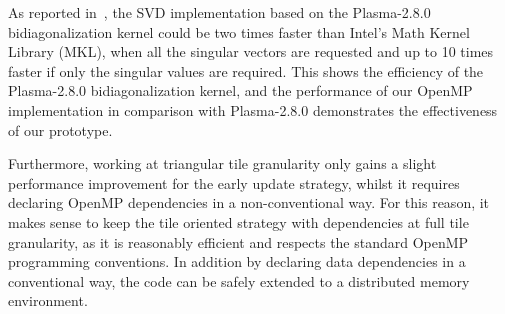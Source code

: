 As reported in~\cite{haidar2013improved},
the SVD implementation based on the
Plasma-2.8.0 bidiagonalization kernel could be two times faster than
Intel’s Math Kernel Library (MKL), when all the singular vectors are
requested and up to 10 times faster if only the singular values are
required. This shows the efficiency of the Plasma-2.8.0 bidiagonalization
kernel, and the performance of our OpenMP implementation
in comparison with Plasma-2.8.0 demonstrates the effectiveness of our prototype.

Furthermore, working at triangular tile granularity only gains
a slight performance improvement for the early update
strategy,
whilst it requires declaring OpenMP dependencies in a
non-conventional way.
For this reason, it makes sense to keep the tile
oriented strategy with dependencies at full tile granularity,
as it is reasonably efficient and respects the standard OpenMP programming
conventions.
In addition by declaring data dependencies in a conventional
way, the code can be safely extended to a distributed memory environment.
